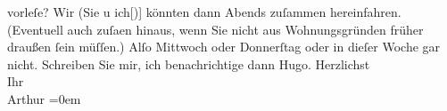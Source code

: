 \begin{ledgroupsized}[t]{13cm}
{                  vorleſe}{}\label{K_L01188_1h}? Wir (Sie u ich{[}){]}{ }{\pb}könnten dann Abends zuſammen
               hereinfahren. (Eventuell auch zuſa{\geminationm}en hinaus, wenn Sie
               nicht aus Wohnungsgründen früher draußen ſein müſſen.)\pend
           \pstart
           Alſo Mittwoch oder Donnerſtag oder in dieſer Woche gar
               nicht.\pend
           \pstart
           {\pb}Schreiben Sie mir, ich benachrichtige dann Hugo.\pend
           \pstart
           Herzlichst{\\[\baselineskip]}Ihr{\\[\baselineskip]}\spacefill\mbox{Arthur}\pend
           \leftskip=0em{}\endnumbering{}\end{ledgroupsized}  \newcommand{\dateiname}{L01188}\newcommand{\titel}{Arthur Schnitzler an Richard Beer-Hofmann, 25. 11. 1901}\newcommand{\editorInnen}{Martin Anton Müller und Gerd-Hermann Susen}
      